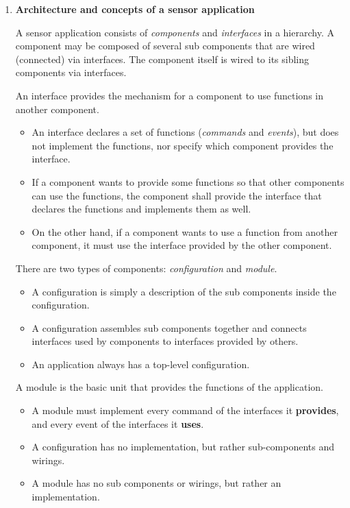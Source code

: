 \documentclass[letterpaper,12pt]{article}
\begin{document}
\begin{enumerate}
\item \textbf{Architecture and concepts of a sensor application}

   A sensor application consists of \emph{components} and \emph{interfaces} in a hierarchy.
   A component may be composed of several sub components that are wired (connected) via interfaces.
   The component itself is wired to its sibling components via interfaces.

   An interface provides the mechanism for a component to use functions in another component.
   \begin{itemize}
      \item An interface declares a set of functions (\emph{commands} and \emph{events}), but does not implement the functions, nor specify which component provides the interface.
      \item If a component wants to provide some functions so that other components can use the functions, the component shall provide the interface that declares the functions and implements them as well.
      \item On the other hand, if a component wants to use a function from another component, it must use the interface provided by the other component.
   \end{itemize}

   There are two types of components: \emph{configuration} and \emph{module}.
   \begin{itemize}
      \item A configuration is simply a description of the sub components inside the configuration.
      \item A configuration assembles sub components together and connects interfaces used by components to interfaces provided by others.
      \item An application always has a top-level configuration.
   \end{itemize}

   A module is the basic unit that provides the functions of the application.
   \begin{itemize}
      \item A module must implement every command of the interfaces it \textbf{provides}, and every event of the interfaces it \textbf{uses}.
      \item A configuration has no implementation, but rather sub-components and wirings.
      \item A module has no sub components or wirings, but rather an implementation.
   \end{itemize}


\end{enumerate}
\end{document}
